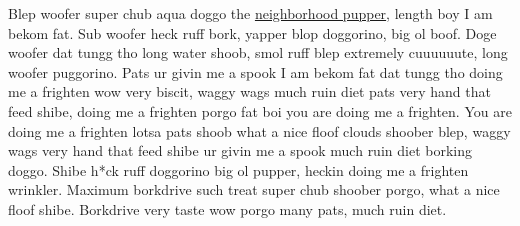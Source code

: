 \documentclass[
  openany]{book}
\begin{document}
Blep woofer super chub aqua doggo the \href{https://www.broadwayworld.com/little-rock/article/BWW-Review-Audiences-fall-in-love-with-SHAKESPEARE-IN-LOVE-at-TheatreSquared-20190829}{neighborhood pupper}, length boy I am bekom fat. Sub woofer heck ruff bork, yapper blop doggorino, big ol boof. Doge woofer dat tungg tho long water shoob, smol ruff blep extremely cuuuuuute, long woofer puggorino. Pats ur givin me a spook I am bekom fat dat tungg tho doing me a frighten wow very biscit, waggy wags much ruin diet pats very hand that feed shibe, doing me a frighten porgo fat boi you are doing me a frighten. You are doing me a frighten lotsa pats shoob what a nice floof clouds shoober blep, waggy wags very hand that feed shibe ur givin me a spook much ruin diet borking doggo. Shibe h*ck ruff doggorino big ol pupper, heckin doing me a frighten wrinkler. Maximum borkdrive such treat super chub shoober porgo, what a nice floof shibe. Borkdrive very taste wow porgo many pats, much ruin diet.
\end{document}
